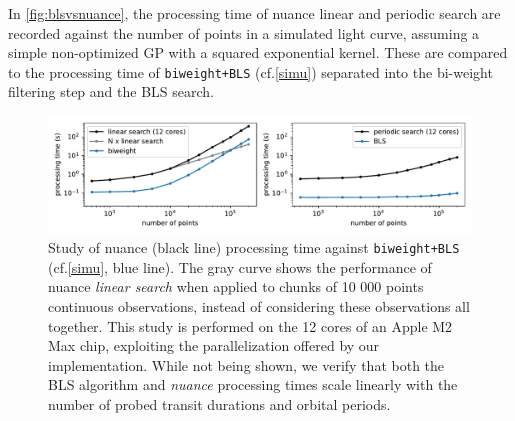 \documentclass[modern]{aastex631}
\newcommand{\nuancemethod}{\textit{nuance}}
\newcommand{\nuancecode}{\textsf{nuance}}
\begin{document}
\noindent In \autoref{fig:blsvsnuance}, the processing time of \nuancecode{} linear and periodic search are recorded against the number of points in a simulated light curve, assuming a simple non-optimized GP with a squared exponential kernel. These are compared to the processing time of \texttt{biweight+BLS} (cf.\;\autoref{simu}) separated into the bi-weight filtering step and the BLS search.
\begin{figure}[H]
    \begin{centering}
        \includegraphics[width=\linewidth]{../workflows/benchmark/figures/nuance_vs_bls.pdf}
        \caption{Study of \textsf{nuance} (black line) processing time against \texttt{biweight+BLS} (cf.\;\autoref{simu}, blue line). The gray curve shows the performance of \textsf{nuance} \textit{linear search} when applied to chunks of 10 000 points continuous observations, instead of considering these observations all together. This study is performed on the 12 cores of an Apple M2 Max chip, exploiting the parallelization offered by our implementation. While not being shown, we verify that both the BLS algorithm and \nuancemethod{} processing times scale linearly with the number of probed transit durations and orbital periods.}
        \label{fig:blsvsnuance}
    \end{centering}
\end{figure}
\end{document}
